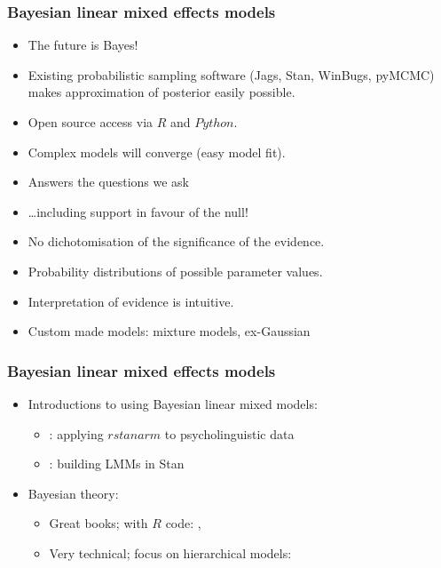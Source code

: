 \begin{frame}
	\frametitle{Bayesian linear mixed effects models}
	
	\begin{itemize}
		\item The future is Bayes!
		\item Existing probabilistic sampling software (Jags, Stan, WinBugs, pyMCMC) makes approximation of posterior easily possible.
		\item Open source access via $R$ and $Python$.
		\item Complex models will converge (easy model fit).
		\item Answers the questions we ask
		\item \dots including support in favour of the null!
		\item No dichotomisation of the significance of the evidence.
		\item Probability distributions of possible parameter values.	
		\item Interpretation of evidence is intuitive.
		\item Custom made models: mixture models, ex-Gaussian 
	\end{itemize}
\end{frame}



\begin{frame}
	\frametitle{Bayesian linear mixed effects models}
	
	\begin{itemize}
		\item Introductions to using Bayesian linear mixed models:
		\begin{itemize}
			\item {}: applying $rstanarm$ to psycholinguistic data
			\item {}: building LMMs in Stan
		\end{itemize}	
		
		\item Bayesian theory: 
		\begin{itemize}
			\item Great books; with $R$ code: , 
			\item Very technical; focus on hierarchical models:   
		\end{itemize}
		
	\end{itemize}
	
\end{frame}